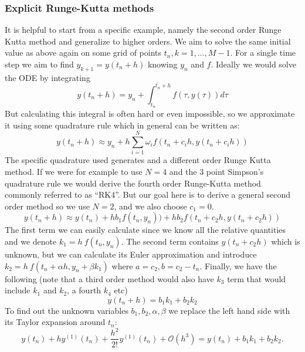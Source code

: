 \documentclass[11pt]{report}
\begin{document}
    \subsubsection{Explicit Runge-Kutta methods}
    It is helpful to start from a specific example, namely the second order Runge Kutta method and generalize to higher
    orders.
    We aim to solve the same initial value as above again on some grid of points ${t_n, k=1, \dots,M-1}$.
    For a single time step we aim to find $y_{k+1} = y(t_n+h)$ knowing $y_n$ and $f$.
    Ideally we would solve the ODE by integrating
    \begin{equation*}
        y(t_n+h) = y_n + \int_{t_n}^{t_n + h} f( \tau, y(\tau) ) d\tau
    \end{equation*}
    But calculating this integral is often hard or even impossible, so we approximate it using some quadrature rule
    which in general can be written as:
    \begin{equation*}
        y(t_n + h) \approx y_n + h\sum_{i=1}^N \omega_i f(t_n + c_i h, y(t_n + c_i h))
    \end{equation*}
    The specific quadrature used generates and a different order Runge Kutta method.
    If we were for example to use $N=4$ and the 3 point Simpson's quadrature rule we would derive the fourth order
    Runge-Kutta method commonly referred to as ``RK4''.
    But our goal here is to derive a general second order method so we use $N=2$, and we also choose $c_1 = 0$.
    \begin{equation*}
        y(t_n+h) \approx y(t_n) + hb_1 f(t_n, y_n)) + hb_2 f(t_n + c_2 h, y(t_n+ c_2 h) )
    \end{equation*}
    The first term we can easily calculate since we know all the relative quantities and we denote
    $k_1 = h\:f(t_n, y_n)$.
    The second term contains $y(t_n + c_2 h)$ which is unknown, but we can calculate its Euler approximation and
    introduce $ k_2 = h\:f(t_n + \alpha h, y_n + \beta k_1) $ where $a=c_2, b = c_2 - t_n$.
    Finally, we have the following (note that a third order method would also have $k_3$ term that would include $k_1$ and $k_2$, a
    fourth $k_4$ etc)
    \begin{equation*}
        y(t_n + h) = b_1 k_1 + b_2 k_2
    \end{equation*}
    To find out the unknown variables $b_1, b_2, \alpha, \beta$ we replace the left hand side with its Taylor expansion
    around $t_n$:
    \begin{equation}
        y(t_n) + h y^{(1)}(t_n) + \frac{h^{2}}{2!}y^{(1)}(t_n) + \mathcal{O}\left(h^{3}\right)
        =
        y(t_n) + b_{1}k_{1} + b_{2}k_{2}.
        \label{eq:tayl1}
    \end{equation}
\end{document}
